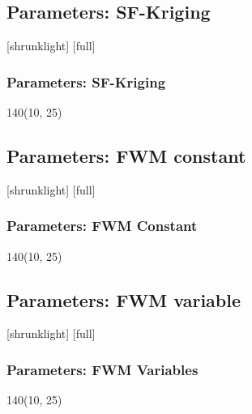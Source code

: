 \subsection{Parameters: SF-Kriging}
[shrunklight]
[full]
\begin{frame}[t]
	\frametitle{Parameters: SF-Kriging}
	\begin{textblock}{140}(10, 25)
		\begin{table}
			\centering
		\end{table}
	\end{textblock}
\end{frame}


\subsection{Parameters: FWM constant}
[shrunklight]
[full]
\begin{frame}[t]
	\frametitle{Parameters: FWM Constant}
	\begin{textblock}{140}(10, 25)
		\begin{table}
			\centering
		\end{table}
	\end{textblock}
\end{frame}


\subsection{Parameters: FWM variable}
[shrunklight]
[full]
\begin{frame}[t]
	\frametitle{Parameters: FWM Variables}
	\begin{textblock}{140}(10, 25)
		\begin{table}
			\centering
		\end{table}
	\end{textblock}
\end{frame}


